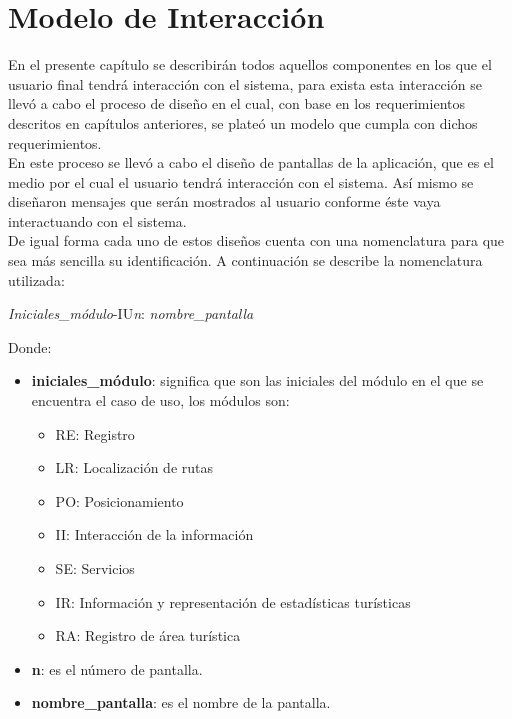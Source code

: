 \chapter{Modelo de Interacción}

En el presente capítulo se describirán todos aquellos componentes en los que el usuario final tendrá interacción con el sistema, para exista esta interacción se llevó a cabo el proceso de diseño en el cual, con base en los requerimientos descritos en capítulos anteriores, se plateó un modelo que cumpla con dichos requerimientos. \\

En este proceso se llevó a cabo el diseño de pantallas de la aplicación, que es el medio por el cual el usuario tendrá interacción con el sistema. Así mismo se diseñaron mensajes que serán mostrados al usuario conforme éste vaya interactuando con el sistema. \\

De igual forma cada uno de estos diseños cuenta con una nomenclatura para que sea más sencilla su identificación. A continuación se describe la nomenclatura utilizada: 

\begin{center}
	\Huge{\textit{Iniciales\_módulo}-IU\textit{n}: \textit{nombre\_pantalla}}
\end{center}

Donde: 

\begin{itemize}
	\item \textbf{iniciales\_módulo}: significa que son las iniciales del módulo en el que se encuentra el caso de uso, los módulos son: 
	\begin{itemize}
		\item RE: Registro
		\item LR: Localización de rutas
		\item PO: Posicionamiento
		\item II: Interacción de la información
		\item SE: Servicios
		\item IR: Información y representación de estadísticas turísticas
		\item RA: Registro de área turística
	\end{itemize}
	
	\item \textbf{n}: es el número de pantalla.
	
	\item \textbf{nombre\_pantalla}: es el nombre de la pantalla.
\end{itemize}

